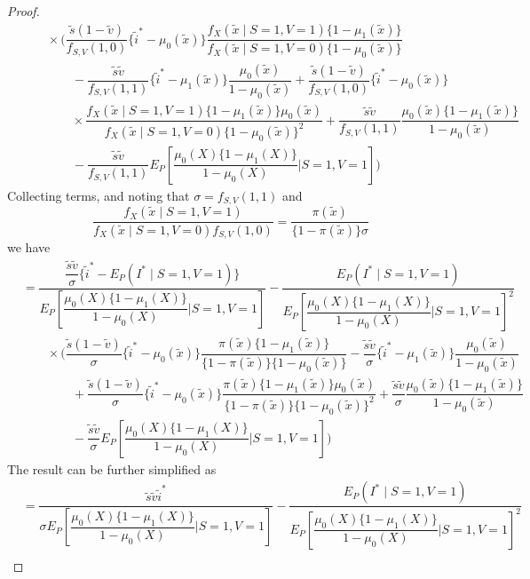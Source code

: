 \begin{appendix}
\begin{proof}
\begin{align*}
   &\qquad \times \bigg( \dfrac{\tilde s(1 - \tilde v)}{f_{S, V}(1, 0)}\{\tilde i^* - \mu_0(\tilde x)\}\dfrac{f_X(\tilde x\mid S=1, V=1)\{1-\mu_1(\tilde x)\}}{f_X(\tilde x\mid S=1, V=0)\{1-\mu_0(\tilde x)\}} \\
   & \qquad \qquad - \dfrac{\tilde s\tilde v}{f_{S, V}(1, 1)}\{\tilde i^* - \mu_1(\tilde x)\}\dfrac{\mu_0(\tilde x)}{1 - \mu_0(\tilde x)} + \dfrac{\tilde s(1 - \tilde v)}{f_{S, V}(1, 0)}\{\tilde i^* - \mu_0(\tilde x)\} \\
   &\qquad \qquad \times \dfrac{f_X(\tilde x\mid S=1, V=1)\{1-\mu_1(\tilde x)\}\mu_0(\tilde x)}{f_X(\tilde x\mid S=1, V=0)\{1-\mu_0(\tilde x)\}^2}+\dfrac{\tilde s\tilde v}{f_{S, V}(1, 1)}\dfrac{\mu_0(\tilde x)\{1-\mu_1(\tilde x)\}}{1-\mu_0(\tilde x)} \\
   & \qquad \qquad - \dfrac{\tilde s\tilde v}{f_{S, V}(1, 1)}E_P\left[\dfrac{\mu_0(X)\{1-\mu_1(X)\}}{1-\mu_0(X)}\bigg| S=1, V=1\right]\bigg) 
\end{align*}
Collecting terms, and noting that $\sigma = f_{S,V}(1, 1)$ and
$$
\dfrac{f_X(\tilde x\mid S=1, V=1)}{f_X(\tilde x\mid S=1, V=0)f_{S,V}(1, 0)} = \dfrac{\pi(\tilde x)}{\{1 - \pi(\tilde x)\} \sigma}
$$
we have
\begin{align*}    
    &= \dfrac{\dfrac{\tilde s\tilde v}{\sigma}\{\tilde i^* - E_P(I^*\mid S=1, V=1)\}}{E_P\left[\dfrac{\mu_0(X)\{1-\mu_1(X)\}}{1-\mu_0(X)} \bigg| S=1, V=1\right]} - \dfrac{E_P(I^*\mid S=1, V=1)}{E_P\left[\dfrac{\mu_0(X)\{1-\mu_1(X)\}}{1-\mu_0(X)}\bigg| S=1, V=1\right]^2} \\
    &\qquad \times \bigg( \dfrac{\tilde s(1 - \tilde v)}{\sigma}\{\tilde i^* - \mu_0(\tilde x)\}\dfrac{\pi(\tilde x)\{1-\mu_1(\tilde x)\}}{\{1-\pi(\tilde x)\}\{1-\mu_0(\tilde x)\}} - \dfrac{\tilde s\tilde v}{\sigma}\{\tilde i^* - \mu_1(\tilde x)\}\dfrac{\mu_0(\tilde x)}{1 - \mu_0(\tilde x)} \\ 
    &\qquad \qquad + \dfrac{\tilde s( 1 -\tilde v)}{\sigma}\{\tilde i^* - \mu_0(\tilde x)\}\dfrac{\pi(\tilde x)\{1 - \mu_1(\tilde x)\}\mu_0(\tilde x)}{\{1 - \pi(\tilde x)\}\{1 - \mu_0(\tilde x)\}^2} + \dfrac{\tilde s \tilde v}{\sigma}\dfrac{\mu_0(\tilde x)\{1 - \mu_1(\tilde x)\}}{1 - \mu_0(\tilde x)} \\
    &\qquad \qquad - \dfrac{\tilde s\tilde v}{\sigma}E_P\left[\dfrac{\mu_0(X)\{1-\mu_1(X)\}}{1-\mu_0(X)}\bigg| S=1, V=1\right]\bigg)
\end{align*}
The result can be further simplified as
\begin{align*}
    &= \dfrac{\tilde s\tilde v\tilde i^*}{\sigma E_P\left[\dfrac{\mu_0(X)\{1 - \mu_1(X)\}}{1 - \mu_0(X)} \bigg| S=1, V=1\right]} - \dfrac{E_P(I^*\mid S=1, V=1)}{E_P\left[\dfrac{\mu_0(X)\{1 - \mu_1(X)\}}{1 - \mu_0(X)}\bigg| S=1, V=1\right]^2} \\

\end{align*}
\end{proof}
\end{appendix}
